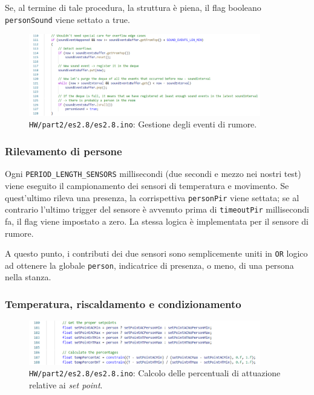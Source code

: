 \documentclass[12pt,a4paper]{article}
\begin{document}
Se, al termine di tale procedura, la struttura è piena, il flag booleano \verb|personSound| viene settato a true.
\begin{figure}[htbp]
    \centering
    \includegraphics[width=0.9\textwidth]{sound.png}
    \caption*{\texttt{HW/part2/es2.8/es2.8.ino}: Gestione degli eventi di rumore.}
    \label{fig:sound}
\end{figure}

\subsubsection{Rilevamento di persone}

Ogni \verb|PERIOD_LENGTH_SENSORS| millisecondi (due secondi e mezzo nei nostri test) viene eseguito il campionamento dei sensori di temperatura e movimento. Se quest'ultimo rileva una presenza, la corrispettiva \verb|personPir| viene settata; se al contrario l'ultimo trigger del sensore è avvenuto prima di \verb|timeoutPir| millisecondi fa, il flag viene impostato a zero. La stessa logica è implementata per il sensore di rumore.

A questo punto, i contributi dei due sensori sono semplicemente uniti in \verb|OR| logico ad ottenere la globale \verb|person|, indicatrice di presenza, o meno, di una persona nella stanza.

\subsubsection{Temperatura, riscaldamento e condizionamento}

\begin{figure}[h]
    \centering
    \includegraphics[width=0.9\textwidth]{set_points.png}
    \caption*{\texttt{HW/part2/es2.8/es2.8.ino}: Calcolo delle percentuali di attuazione relative ai \textit{set point}.}
    \label{fig:set_points}
\end{figure}
\end{document}
